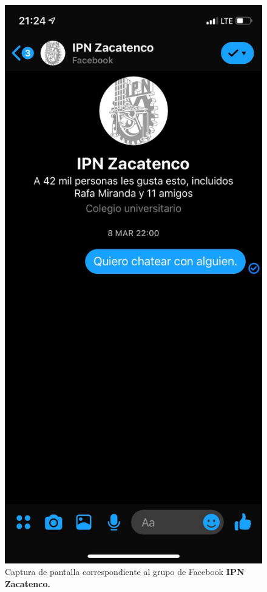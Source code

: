     \begin{figure}[H]
       \begin{minipage}{0.5\textwidth}
         \centering
         \includegraphics[width=.7\linewidth]{Latex/Classes/Imagenes/ss-ipn.jpg}
         \caption{Captura de pantalla correspondiente al grupo de Facebook \bf{IPN Zacatenco}.}
       \end{minipage}\hfill
       \begin{minipage}{0.5\textwidth}
         \centering

\end{minipage}
\end{figure}
